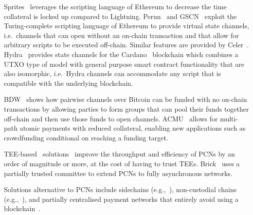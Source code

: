   Sprites~\cite{sprites} leverages the scripting language of Ethereum to
  decrease the time collateral is locked up compared to Lightning.
  Perun~\cite{perun} and GSCN~\cite{DBLP:conf/ccs/DziembowskiFH18} exploit the
  Turing-complete scripting language of Ethereum to provide virtual state
  channels, i.e.\ channels that can open without an on-chain transaction and that
  allow for arbitrary scripts to be executed off-chain. Similar features are
  provided by Celer~\cite{dong2018celer}. Hydra~\cite{cryptoeprint:2020:299}
  provides state channels for the Cardano~\cite{cardano} blockchain which
  combines a UTXO type of model with general purpose smart contract
  functionality that are also isomorphic, i.e.\ Hydra channels can accommodate
  any script that is compatible with the underlying blockchain.

  BDW~\cite{scalable-funding} shows how pairwise channels over Bitcoin can be   funded with no on-chain transactions by allowing parties to form groups that   can pool their funds together off-chain and then use those funds to open   channels. ACMU~\cite{10.1145/3319535.3345666} allows for multi-path atomic   payments with reduced collateral, enabling new applications such as   crowdfunding conditional on reaching a funding target.

  TEE-based~\cite{zhao2019sok}
solutions~\cite{teechan,10.1145/3341301.3359627,liao2021speedster,lee2020routee}
  improve the throughput and efficiency of PCNs by an order of magnitude or
  more, at the cost of having to trust TEEs. Brick~\cite{avarikioti2020brick}
  uses a partially trusted committee to extend PCNs to fully asynchronous
  networks.

  Solutions alternative to PCNs include 
side\-chains (e.g.,~\cite{BCDF+14,sidechains,KiaZin18}),
non-custo\-dial chains (e.g.,~\cite{plasma,konstantopoulos2019plasma,plasma-lower-bounds,rollup}),
  and partially centralised payment networks that entirely avoid using a blockchain~\cite{DBLP:conf/trust/ArmknechtKMYZ15,stellar,silentwhispers,DBLP:conf/ndss/RoosMKG18}. 

